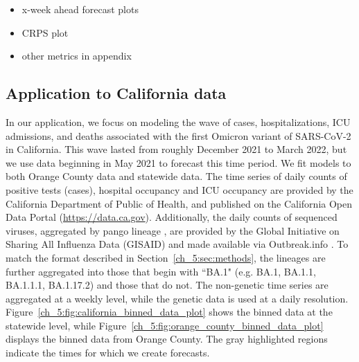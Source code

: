\begin{itemize}
    \item x-week ahead forecast plots
    \item CRPS plot
    \item other metrics in appendix
\end{itemize}




\subsection{Application to California data}
\label{ch_5:subsec:application}

In our application, we focus on modeling the wave of cases, hospitalizations, ICU admissions, and deaths associated with the first Omicron variant of SARS-CoV-2 in California.
This wave lasted from roughly December 2021 to March 2022, but we use data beginning in May 2021 to forecast this time period.
We fit models to both Orange County data and statewide data.
The time series of daily counts of positive tests (cases), hospital occupancy and ICU occupancy are provided by the California Department of Public of Health, and published on the California Open Data Portal (\url{https://data.ca.gov}).
Additionally, the daily counts of sequenced viruses, aggregated by pango lineage \citep{pango}, are provided by the Global Initiative on Sharing All Influenza Data (GISAID) \citep{shu2017gisaid} and made available via Outbreak.info \citep{Gangavarapu2023}.
To match the format described in Section~\ref{ch_5:sec:methods}, the lineages are further aggregated into those that begin with ``BA.1" (e.g. BA.1, BA.1.1, BA.1.1.1, BA.1.17.2) and those that do not.
The non-genetic time series are aggregated at a weekly level, while the genetic data is used at a daily resolution.
Figure~\ref{ch_5:fig:california_binned_data_plot} shows the binned data at the statewide level, while Figure~\ref{ch_5:fig:orange_county_binned_data_plot} displays the binned data from Orange County.
The gray highlighted regions indicate the times for which we create forecasts.

